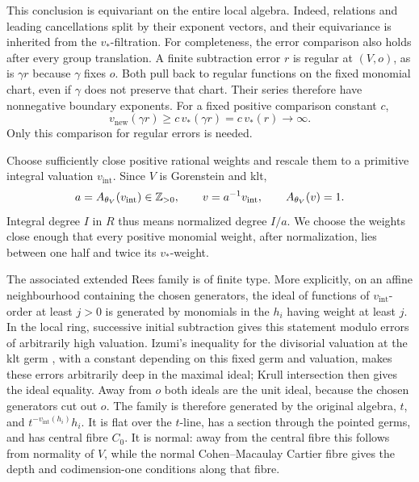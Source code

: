 This conclusion is equivariant on the entire local algebra.  Indeed,
relations and leading cancellations split by their exponent vectors,
and their equivariance is inherited from the $v_*$-filtration.  For
completeness, the error comparison also holds after every group
translation.  A finite subtraction error $r$ is regular at $(V,o)$, as
is $\gamma r$ because $\gamma$ fixes $o$.  Both pull back to regular
functions on the fixed monomial chart, even if $\gamma$ does not preserve
that chart.  Their series therefore have nonnegative boundary
exponents.  For a fixed positive comparison constant $c$,
\[
 v_{\mathrm{new}}(\gamma r)
 \geq c\,v_*(\gamma r)=c\,v_*(r)\longrightarrow\infty.
\]
Only this comparison for regular errors is needed.

Choose sufficiently close positive rational weights and rescale them to
a primitive integral valuation $v_{\mathrm{int}}$.  Since $V$ is
Gorenstein and klt,
\begin{equation}\label{cone:normalization}
 a=A_{\theta_V}(v_{\mathrm{int}})\in\mathbb Z_{>0},
 \qquad v=a^{-1}v_{\mathrm{int}},\qquad A_{\theta_V}(v)=1.
\end{equation}
Integral degree $I$ in $R$ thus means normalized degree $I/a$.  We choose
the weights close enough that every positive monomial weight, after
normalization, lies between one half and twice its $v_*$-weight.

The associated extended Rees family is of finite type.  More explicitly,
on an affine neighbourhood containing the chosen generators, the ideal
of functions of $v_{\mathrm{int}}$-order at least $j>0$ is generated by
monomials in the $h_i$ having weight at least $j$.  In the local ring,
successive initial subtraction gives this statement modulo errors of
arbitrarily high valuation.  Izumi's inequality for the divisorial
valuation at the klt germ \cite[Theorem~3.1]{LiMinimizing}, with a
constant depending on this fixed germ and valuation, makes these errors
arbitrarily deep in the maximal ideal; Krull intersection then gives the
ideal equality.  Away from $o$ both ideals are the unit ideal, because
the chosen generators cut out $o$.  The family is therefore generated
by the original algebra, $t$, and
$t^{-v_{\mathrm{int}}(h_i)}h_i$.  It is flat over the $t$-line, has a
section through the pointed germs, and has central fibre $C_0$.
It is normal: away from the central fibre this follows from normality of
$V$, while the normal Cohen--Macaulay Cartier fibre gives the depth and
codimension-one conditions along that fibre.

